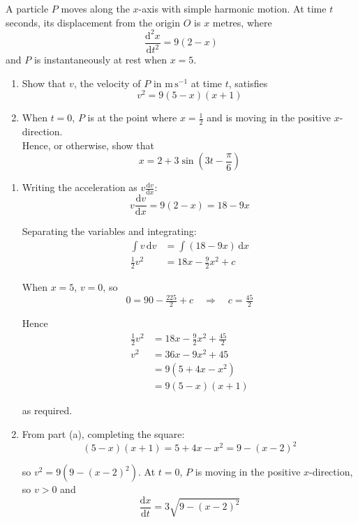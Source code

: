 \documentclass[leqno]{article}
\begin{document}
\begin{enumerate}[
  label=\textbf{\arabic*.},
  leftmargin=*,
  topsep=0pt,
  partopsep=0pt,
  parsep=0pt
]
A particle $P$ moves along the $x$-axis with simple harmonic motion. At time $t$ seconds, its displacement from the origin $O$ is $x$ metres, where
\[
\frac{\mathrm{d}^2x}{\mathrm{d}t^2}=9(2-x)
\]
and $P$ is instantaneously at rest when $x=5$. \\
\begin{enumerate}[label=\textbf{(\alph*)}]
\item Show that $v$, the velocity of $P$ in $\mathrm{m\,s^{-1}}$ at time $t$, satisfies
\[
v^2=9(5-x)(x+1)
\]
\item When $t=0$, $P$ is at the point where $x=\frac{1}{2}$ and is moving in the positive $x$-direction. \\
Hence, or otherwise, show that
\[
x=2+3\sin\left(3t-\frac{\pi}{6}\right)
\]
\end{enumerate}

\vspace*{10pt}

\begin{djsSolution}
\begin{enumerate}[label=\textbf{(\alph*)}, start=1]
\item Writing the acceleration as \(v\frac{\mathrm{d}v}{\mathrm{d}x}\):
\[
v\frac{\mathrm{d}v}{\mathrm{d}x}=9(2-x)=18-9x
\]

Separating the variables and integrating:
\begin{align*}
\int v\,\mathrm{d}v&=\int (18-9x)\,\mathrm{d}x\\
\tfrac12 v^2&=18x-\tfrac92x^2+c
\end{align*}

When \(x=5\), \(v=0\), so
\[
0=90-\tfrac{225}{2}+c\quad\Longrightarrow\quad c=\tfrac{45}{2}
\]

Hence
\begin{align*}
\tfrac12 v^2&=18x-\tfrac92x^2+\tfrac{45}{2}\\
v^2&=36x-9x^2+45\\
&=9\left(5+4x-x^2\right)\\
&=9(5-x)(x+1)
\end{align*}

as required.

\item From part (a), completing the square:
\[
(5-x)(x+1)=5+4x-x^2=9-(x-2)^2
\]

so \(v^2=9\left(9-(x-2)^2\right)\). At \(t=0\), \(P\) is moving in the positive \(x\)-direction, so \(v>0\) and
\[
\frac{\mathrm{d}x}{\mathrm{d}t}=3\sqrt{9-(x-2)^2}
\]


\end{enumerate}
\end{djsSolution}
\end{enumerate}
\end{document}
